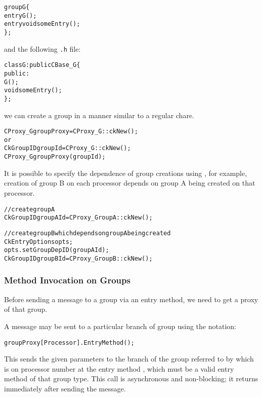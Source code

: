 \begin{alltt}
group G \{
  entry G();
  entry void someEntry();
\};
\end{alltt}

and the following \texttt{.h} file:

\begin{alltt}
class G : public CBase\_G \{
  public:
    G();
    void someEntry();
\};
\end{alltt}

we can create a group in a manner similar to a regular
chare. 

\begin{alltt}
CProxy_G groupProxy = CProxy_G::ckNew();
or
CkGroupID groupId = CProxy_G::ckNew();
CProxy_G groupProxy(groupId);
\end{alltt}

It is possible to specify the dependence of group creations using
, for example, creation of group B on each processor depends
on group A being created on that processor.

\begin{alltt}
// create group A
CkGroupID groupAId = CProxy_GroupA::ckNew();

// create group B which depends on group A being created
CkEntryOptions opts;
opts.setGroupDepID(groupAId);
CkGroupID groupBId = CProxy_GroupB::ckNew();
\end{alltt}

\subsubsection{Method Invocation on Groups}

Before sending a message to a group via an entry
method, we need to get a proxy of that group.

A message may be sent to a particular branch of group using the
notation:

\begin{alltt}
 groupProxy[Processor].EntryMethod();
\end{alltt}

This sends the given parameters to the branch of
the group referred to by  which is on processor number
 at the entry method , which must be a valid
entry method of that group type. This call is asynchronous and non-blocking; it
returns immediately after sending the message.


